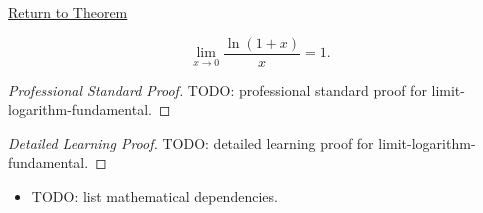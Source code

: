 \newpage
{}
\label{prf:limit-logarithm-fundamental}

\begin{remark*}[Return]
\hyperref[prop:limit-logarithm-fundamental]{Return to Theorem}
\end{remark*}

\begin{theorem*}
\[
  \lim_{x \to 0} \frac{\ln(1+x)}{x} = 1.
\]

\smallskip\noindent
\end{theorem*}

\begin{proof}[Professional Standard Proof]
\LRAProofBodyStart
TODO: professional standard proof for limit-logarithm-fundamental.
\end{proof}

\begin{proof}[Detailed Learning Proof]
\LRAProofBodyStart
TODO: detailed learning proof for limit-logarithm-fundamental.
\end{proof}

\begin{remark*}
\end{remark*}

\begin{dependencies}
\begin{itemize}
  \item TODO: list mathematical dependencies.
\end{itemize}
\end{dependencies}

\clearpage
